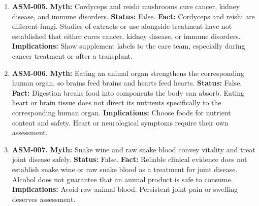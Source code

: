 \documentclass[11pt,oneside]{book}
\begin{document}
\begin{enumerate}[leftmargin=0pt,labelwidth=0pt,labelsep=0pt,itemindent=0pt]
\textbf{Fact:} Studies of Asian ginseng have examined fatigue and other outcomes, with results that depend on the condition and preparation. They do not establish a general effect on youth, fertility, or immunity. \cite{ref141,ref478}\newline
\textbf{Implications:} Review the exact product and purpose. Ginseng can cause insomnia and interact with medicines.
\item[] \textbf{ASM-005.} \textbf{Myth:} Cordyceps and reishi mushrooms cure cancer, kidney disease, and immune disorders.\newline
\textbf{Status:} False.\newline
\textbf{Fact:} Cordyceps and reishi are different fungi. Studies of extracts or use alongside treatment have not established that either cures cancer, kidney disease, or immune disorders. \cite{ref142,ref479}\newline
\textbf{Implications:} Show supplement labels to the care team, especially during cancer treatment or after a transplant.
\item[] \textbf{ASM-006.} \textbf{Myth:} Eating an animal organ strengthens the corresponding human organ, so brains feed brains and hearts feed hearts.\newline
\textbf{Status:} False.\newline
\textbf{Fact:} Digestion breaks food into components the body can absorb. Eating heart or brain tissue does not direct its nutrients specifically to the corresponding human organ. \cite{ref209}\newline
\textbf{Implications:} Choose foods for nutrient content and safety. Heart or neurological symptoms require their own assessment.
\item[] \textbf{ASM-007.} \textbf{Myth:} Snake wine and raw snake blood convey vitality and treat joint disease safely.\newline
\textbf{Status:} False.\newline
\textbf{Fact:} Reliable clinical evidence does not establish snake wine or raw snake blood as a treatment for joint disease. Alcohol does not guarantee that an animal product is safe to consume. \cite{ref480}\newline
\textbf{Implications:} Avoid raw animal blood. Persistent joint pain or swelling deserves assessment.
\end{enumerate}
\end{document}
